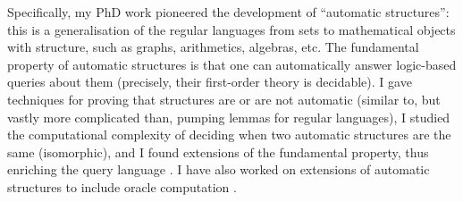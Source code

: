 \documentclass[10pt,a4paper,sans]{moderncv}
\begin{document}
Specifically, my PhD work pioneered the development of ``automatic structures'': this is a generalisation of the regular languages from sets to mathematical objects with structure, such as graphs, arithmetics, algebras, etc.  The fundamental property of automatic structures is that one can automatically answer logic-based queries about them (precisely, their first-order theory is decidable). I gave techniques for proving that structures are or are not automatic (similar to, but vastly more complicated than, pumping lemmas for regular languages), I studied the computational complexity of deciding when two automatic structures are the same (isomorphic), and I found extensions of the fundamental property, thus enriching the query language \cite{BGR11,DBLP:conf/lics/IshiharaKR02,DBLP:conf/lics/KhoussainovNRS04,DBLP:journals/lmcs/KhoussainovNRS07,DBLP:conf/lics/KhoussainovRS03,DBLP:conf/stacs/KhoussainovRS04,DBLP:journals/tocl/KhoussainovRS05,DBLP:journals/bsl/Rubin08}. I have also worked on extensions of automatic structures to include oracle computation \cite{DBLP:journals/corr/abs-1210-2462,DBLP:conf/lics/RabinovichR12}.
\newline


% 
% 






% 
 
 
 \pagebreak
 


\end{document}
